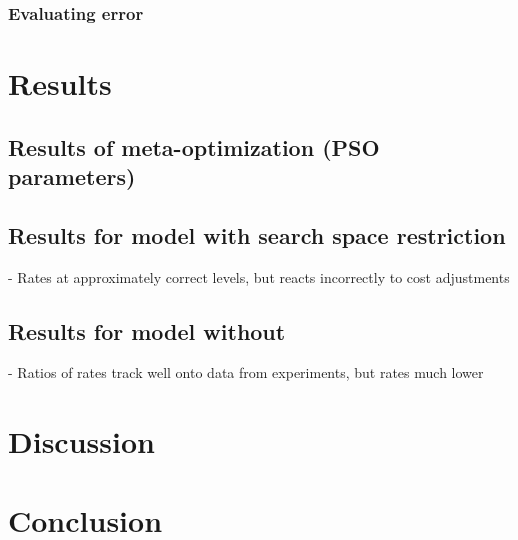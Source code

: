 \documentclass[12pt]{article}
\begin{document}
\subsubsection{Evaluating error}

\section{Results}
\subsection{Results of meta-optimization (PSO parameters)}
\subsection{Results for model with search space restriction}
- Rates at approximately correct levels, but reacts incorrectly to cost adjustments
\subsection{Results for model without}
- Ratios of rates track well onto data from experiments, but rates much lower


\section{Discussion}



\section{Conclusion}





\end{document}
